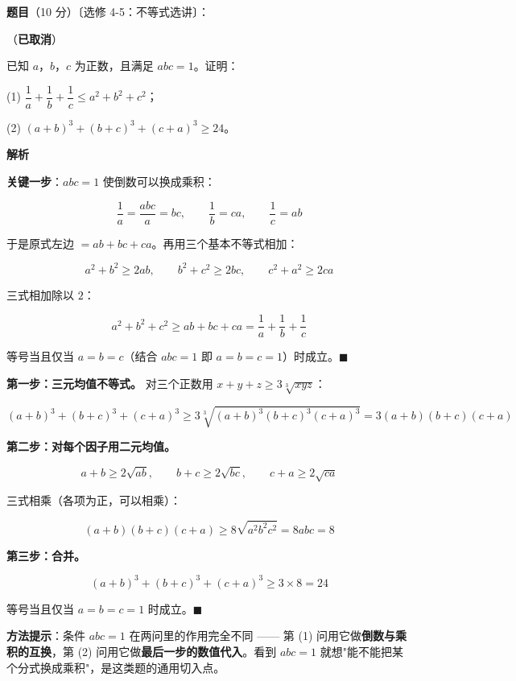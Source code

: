 \begin{answer}

\textbf{题目}（10 分）〔选修 4-5：不等式选讲〕：

（\textbf{已取消}）

已知 $a$，$b$，$c$ 为正数，且满足 $abc=1$。证明：

  (1) $\dfrac1a+\dfrac1b+\dfrac1c\le a^{2}+b^{2}+c^{2}$；

  (2) $(a+b)^{3}+(b+c)^{3}+(c+a)^{3}\ge24$。

\par\medskip

\textbf{解析}


\textbf{关键一步}：$abc=1$ 使倒数可以换成乘积：

\nopagebreak[4]
\[\frac1a=\frac{abc}a=bc,\qquad \frac1b=ca,\qquad \frac1c=ab\]

于是原式左边 $=ab+bc+ca$。再用三个基本不等式相加：

\nopagebreak[4]
\[a^{2}+b^{2}\ge2ab,\qquad b^{2}+c^{2}\ge2bc,\qquad c^{2}+a^{2}\ge2ca\]

三式相加除以 $2$：

\nopagebreak[4]
\[a^{2}+b^{2}+c^{2}\ge ab+bc+ca=\frac1a+\frac1b+\frac1c\]

等号当且仅当 $a=b=c$（结合 $abc=1$ 即 $a=b=c=1$）时成立。$\blacksquare$


\textbf{第一步：三元均值不等式。} 对三个正数用 $x+y+z\ge3\sqrt[3]{xyz}$：

\nopagebreak[4]
\[(a+b)^{3}+(b+c)^{3}+(c+a)^{3}\ge3\sqrt[3]{(a+b)^{3}(b+c)^{3}(c+a)^{3}}=3(a+b)(b+c)(c+a)\]

\textbf{第二步：对每个因子用二元均值。}

\nopagebreak[4]
\[a+b\ge2\sqrt{ab},\qquad b+c\ge2\sqrt{bc},\qquad c+a\ge2\sqrt{ca}\]

三式相乘（各项为正，可以相乘）：

\nopagebreak[4]
\[(a+b)(b+c)(c+a)\ge8\sqrt{a^{2}b^{2}c^{2}}=8abc=8\]

\textbf{第三步：合并。}

\nopagebreak[4]
\[(a+b)^{3}+(b+c)^{3}+(c+a)^{3}\ge3\times8=24\]

等号当且仅当 $a=b=c=1$ 时成立。$\blacksquare$

\begin{gktip}
\textbf{方法提示}：条件 $abc=1$ 在两问里的作用完全不同 —— 第 (1) 问用它做\textbf{倒数与乘积的互换}，第 (2) 问用它做\textbf{最后一步的数值代入}。看到 $abc=1$ 就想"能不能把某个分式换成乘积"，是这类题的通用切入点。
\end{gktip}

\par\medskip



\end{answer}